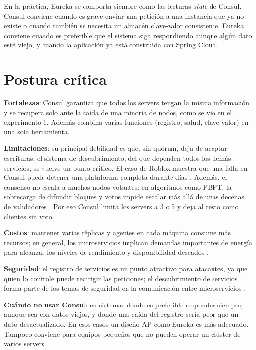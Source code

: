 \documentclass[12pt,a4paper]{article}
\begin{document}
En la práctica, Eureka se comporta siempre como las lecturas \textit{stale} de Consul. Consul conviene cuando es grave enviar una petición a una instancia que ya no existe o cuando también se necesita un almacén clave-valor consistente. Eureka conviene cuando es preferible que el sistema siga respondiendo aunque algún dato esté viejo, y cuando la aplicación ya está construida con Spring Cloud.

\section{Postura crítica}
\textbf{Fortalezas}: Consul garantiza que todos los servers tengan la misma información y se recupera solo ante la caída de una minoría de nodos, como se vio en el experimento 1. Además combina varias funciones (registro, salud, clave-valor) en una sola herramienta.

\textbf{Limitaciones}: su principal debilidad es que, sin quórum, deja de aceptar escrituras; el sistema de descubrimiento, del que dependen todos los demás servicios, se vuelve un punto crítico. El caso de Roblox muestra que una falla en Consul puede detener una plataforma completa durante días \cite{roblox2022outage}. Además, el consenso no escala a muchos nodos votantes: en algoritmos como PBFT, la sobrecarga de difundir bloques y votos impide escalar más allá de unas decenas de validadores \cite{islam2023consensus}. Por eso Consul limita los servers a 3 o 5 y deja al resto como clientes sin voto.

\textbf{Costos}: mantener varias réplicas y agentes en cada máquina consume más recursos; en general, los microservicios implican demandas importantes de energía para alcanzar los niveles de rendimiento y disponibilidad deseados \cite{araujo2024energy}.

\textbf{Seguridad}: el registro de servicios es un punto atractivo para atacantes, ya que quien lo controle puede redirigir las peticiones; el descubrimiento de servicios forma parte de los temas de seguridad en la comunicación entre microservicios \cite{haindl2024security}.

\textbf{Cuándo no usar Consul}: en sistemas donde es preferible responder siempre, aunque sea con datos viejos, y donde una caída del registro sería peor que un dato desactualizado. En esos casos un diseño AP como Eureka es más adecuado. Tampoco conviene para equipos pequeños que no pueden operar un clúster de varios servers.
\end{document}
